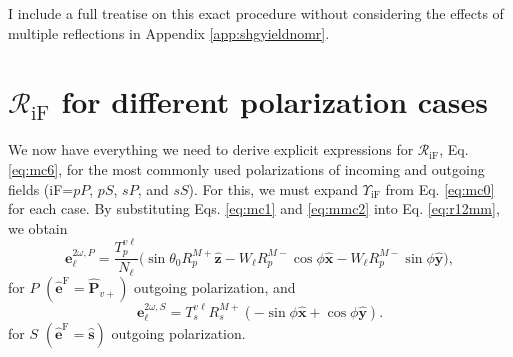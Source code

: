 I include a full treatise on this exact procedure without considering the
effects of multiple reflections in Appendix \ref{app:shgyieldnomr}.



\section{\texorpdfstring{$\mathcal{R}_{\mathrm{iF}}$}{R} for different
polarization cases}\label{sec:rcases}

We now have everything we need to derive explicit expressions for
$\mathcal{R}_{\mathrm{iF}}$, Eq. \eqref{eq:mc6}, for the most commonly used
polarizations of incoming and outgoing fields (iF=$pP$, $pS$, $sP$, and $sS$).
For this, we must expand $\Upsilon_{\mathrm{iF}}$ from Eq. \eqref{eq:mc0} for
each case. By substituting Eqs. \eqref{eq:mc1} and \eqref{eq:mmc2} into Eq.
\eqref{eq:r12mm}, we obtain
\begin{equation}\label{eq:e2wpmr}
\mathbf{e}^{2\omega,P}_{\ell} =
\frac{T^{v\ell}_{p}}{N_{\ell}}
\big(
  \sin\theta_{0}R^{M+}_{p}\hat{\mathbf{z}}
- W_{\ell}R^{M-}_{p}\cos\phi\hat{\mathbf{x}}
- W_{\ell}R^{M-}_{p}\sin\phi\hat{\mathbf{y}}
\big),
\end{equation}
for $P$ $(\hat{\mathbf{e}}^{\mathrm{F}} = \hat{\mathbf{P}}_{v+})$ outgoing
polarization, and
\begin{equation}\label{eq:e2wsmr}
\mathbf{e}^{2\omega,S}_{\ell} =
T_{s}^{v\ell}R^{M+}_{s}
\left(
- \sin\phi\hat{\mathbf{x}}
+ \cos\phi\hat{\mathbf{y}}
\right).
\end{equation}
for $S$ $(\hat{\mathbf{e}}^{\mathrm{F}}=\hat{\mathbf{s}})$ outgoing
polarization.

